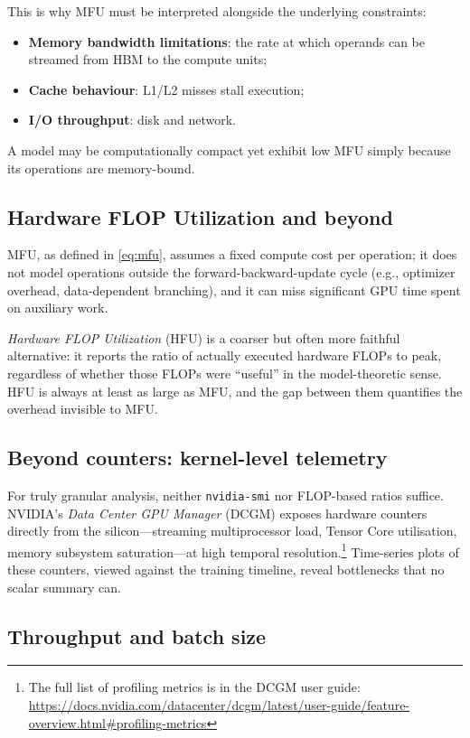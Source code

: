 \documentclass[11pt,a4paper]{article}
\theoremstyle{definition}
\theoremstyle{remark}
\theoremstyle{plain}
\begin{document}
This is why MFU must be interpreted alongside the underlying constraints:
\begin{itemize}[leftmargin=1.5em, itemsep=2pt]
    \item \textbf{Memory bandwidth limitations}: the rate at which
          operands can be streamed from HBM to the compute units;
    \item \textbf{Cache behaviour}: L1/L2 misses stall execution;
    \item \textbf{I/O throughput}: disk and network.
\end{itemize}
A model may be computationally compact yet exhibit low MFU simply because
its operations are memory-bound.

\subsection{Hardware FLOP Utilization and beyond}

MFU, as defined in \eqref{eq:mfu}, assumes a fixed compute cost per
operation; it does not model operations outside the
forward-backward-update cycle (e.g., optimizer overhead, data-dependent
branching), and it can miss significant GPU time spent on auxiliary work.

\emph{Hardware FLOP Utilization} (HFU) is a coarser but often more
faithful alternative: it reports the ratio of actually executed hardware
FLOPs to peak, regardless of whether those FLOPs were ``useful'' in the
model-theoretic sense. HFU is always at least as large as MFU, and the
gap between them quantifies the overhead invisible to MFU.

\subsection{Beyond counters: kernel-level telemetry}

For truly granular analysis, neither \texttt{nvidia-smi} nor FLOP-based
ratios suffice. NVIDIA's \emph{Data Center GPU Manager} (DCGM) exposes
hardware counters directly from the silicon---streaming multiprocessor
load, Tensor Core utilisation, memory subsystem saturation---at high
temporal resolution.\footnote{The full list of profiling metrics is in
the DCGM user guide:
\url{https://docs.nvidia.com/datacenter/dcgm/latest/user-guide/feature-overview.html\#profiling-metrics}}
Time-series plots of these counters, viewed against the training
timeline, reveal bottlenecks that no scalar summary can.

\subsection{Throughput and batch size}
\end{document}
